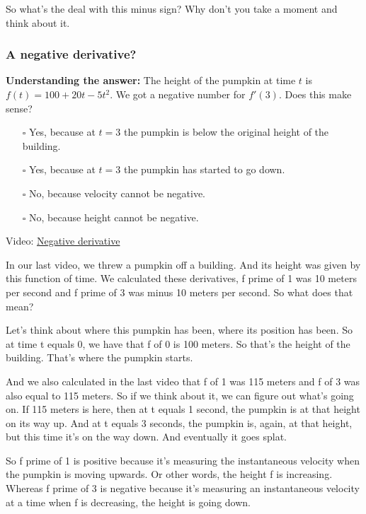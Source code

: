 \documentclass[pdftex, brazil, 12pt, twoside]{article}
\begin{document}
So what's the deal with this minus sign?
Why don't you take a moment and think about it.

\subsubsection{A negative derivative?}
\label{u1-what-negative-derivative}

\begin{exercise}
  \textbf{Understanding the answer:} The height of the pumpkin at time $t$ is
  $f(t) = 100+20t-5t^2$. We got a negative number for $f'(3)$. Does this make sense?
\begin{itemize}[noitemsep]
\item[$\square$] Yes, because at $t=3$ the pumpkin is below the original
  height of the building.
\item[$\square$] Yes, because at $t=3$ the pumpkin has started to go down.
\item[$\square$] No, because velocity cannot be negative.
\item[$\square$] No, because height cannot be negative. 
\end{itemize}
\end{exercise}

Video: \href{https://www.youtube.com/watch?v=qdvlaefmi7I}{Negative derivative}

In our last video, we threw a pumpkin off a building.
And its height was given by this function of time.
We calculated these derivatives, f prime of 1
was 10 meters per second and f prime of 3
was minus 10 meters per second.
So what does that mean?

Let's think about where this pumpkin has been,
where its position has been.
So at time t equals 0, we have that f of 0 is 100 meters.
So that's the height of the building.
That's where the pumpkin starts.

And we also calculated in the last video that f of 1
was 115 meters and f of 3 was also equal to 115 meters.
So if we think about it, we can figure out what's going on.
If 115 meters is here, then at t equals 1 second,
the pumpkin is at that height on its way up.
And at t equals 3 seconds, the pumpkin
is, again, at that height, but this time it's on the way down.
And eventually it goes splat.

So f prime of 1 is positive because it's
measuring the instantaneous velocity when
the pumpkin is moving upwards.
Or other words, the height f is increasing.
Whereas f prime of 3 is negative because it's
measuring an instantaneous velocity
at a time when f is decreasing, the height is going down.
\end{document}
